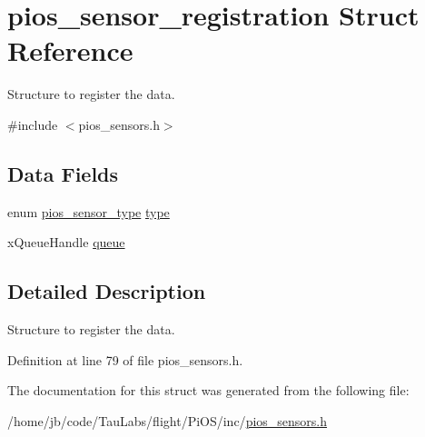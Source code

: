 \hypertarget{structpios__sensor__registration}{\section{pios\-\_\-sensor\-\_\-registration \-Struct \-Reference}
\label{structpios__sensor__registration}
}


\-Structure to register the data.  




{\ttfamily \#include $<$pios\-\_\-sensors.\-h$>$}

\subsection*{\-Data \-Fields}
\begin{DoxyCompactItemize}
\item 
enum \hyperlink{group___p_i_o_s___s_e_n_s_o_r_s_gadad1b67d985a6c9c150a70d23aac96a0}{pios\-\_\-sensor\-\_\-type} \hyperlink{group___p_i_o_s___s_e_n_s_o_r_s_gaf66f51be389998d910c8e9d3fc826a75}{type}
\item 
x\-Queue\-Handle \hyperlink{group___p_i_o_s___s_e_n_s_o_r_s_gaeea1102e8510b8a5f3bb0cf298e7ebea}{queue}
\end{DoxyCompactItemize}


\subsection{\-Detailed \-Description}
\-Structure to register the data. 

\-Definition at line 79 of file pios\-\_\-sensors.\-h.



\-The documentation for this struct was generated from the following file\-:\begin{DoxyCompactItemize}
\item 
/home/jb/code/\-Tau\-Labs/flight/\-Pi\-O\-S/inc/\hyperlink{pios__sensors_8h}{pios\-\_\-sensors.\-h}\end{DoxyCompactItemize}
